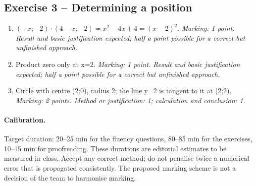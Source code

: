 \subsection*{Exercise 3 -- Determining a position}
\begin{enumerate}
\item $(-x;-2)\cdot(4-x;-2)=x^2-4x+4=(x-2)^2$. \textit{Marking: 1 point. Result and basic justification expected; half a point possible for a correct but unfinished approach.}
\item Product zero only at x=2. \textit{Marking: 1 point. Result and basic justification expected; half a point possible for a correct but unfinished approach.}
\item Circle with centre (2;0), radius 2; the line y=2 is tangent to it at (2;2). \textit{Marking: 2 points. Method or justification: 1; calculation and conclusion: 1.}
\end{enumerate}
\paragraph{Calibration.} Target duration: 20--25 min for the fluency questions, 80--85 min for the exercises, 10--15 min for proofreading. These durations are editorial estimates to be measured in class. Accept any correct method; do not penalise twice a numerical error that is propagated consistently. The proposed marking scheme is not a decision of the team to harmonise marking.
